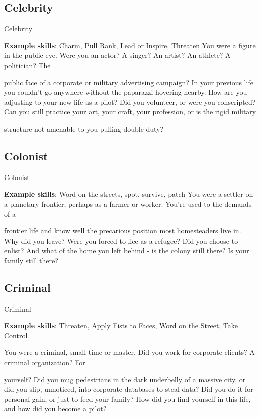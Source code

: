\subsection{Celebrity}
                                                    Celebrity

\textbf{Example skills}: Charm, Pull Rank, Lead or Inspire, Threaten
You were a figure in the public eye. Were you an actor? A singer? An artist? An athlete? A politician? The

public face of a corporate or military advertising campaign? In your previous life you couldn’t go anywhere
without the paparazzi hovering nearby. How are you adjusting to your new life as a pilot? Did you volunteer,
or were you conscripted? Can you still practice your art, your craft, your profession, or is the rigid military

structure not amenable to you pulling double-duty?

\subsection{Colonist}
                                                    Colonist

\textbf{Example skills}: Word on the streets, spot, survive, patch
You were a settler on a planetary frontier, perhaps as a farmer or worker. You’re used to the demands of a

frontier life and know well the precarious position most homesteaders live in. Why did you leave? Were you
forced to flee as a refugee? Did you choose to enlist? And what of the home you left behind - is the colony
still there? Is your family still there?

\subsection{Criminal}
                                                    Criminal

\textbf{Example skills}: Threaten, Apply Fists to Faces, Word on the Street, Take Control

You were a criminal, small time or master. Did you work for corporate clients? A criminal organization? For

yourself? Did you mug pedestrians in the dark underbelly of a massive city, or did you slip, unnoticed, into
corporate databases to steal data? Did you do it for personal gain, or just to feed your family? How did you
find yourself in this life, and how did you become a pilot?

